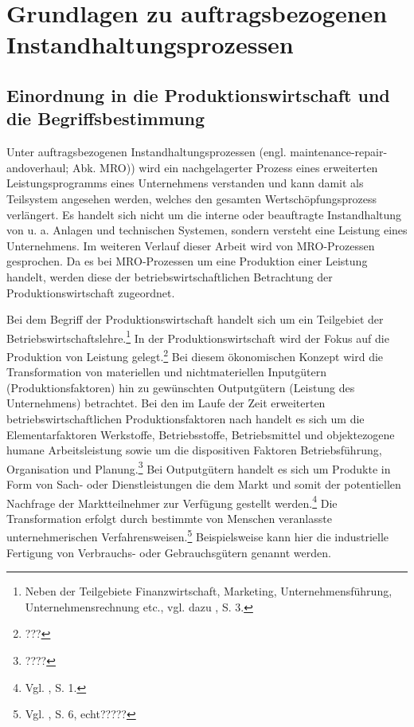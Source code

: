 \chapter{Grundlagen zu auftragsbezogenen Instandhaltungsprozessen}
\setcounter{footnote}{4}  %

\section{Einordnung in die Produktionswirtschaft und die Begriffsbestimmung}

Unter auftragsbezogenen Instandhaltungsprozessen (engl. maintenance-repair-and\-overhaul; Abk. MRO)) wird ein nachgelagerter Prozess eines erweiterten Leistungsprogramms eines Unternehmens verstanden und kann damit als Teilsystem angesehen werden, welches den gesamten Wertschöpfungsprozess verlängert. Es handelt sich nicht um die interne oder beauftragte Instandhaltung von u. a. Anlagen und technischen Systemen, sondern versteht eine Leistung eines Unternehmens. Im weiteren Verlauf dieser Arbeit wird von MRO-Prozessen gesprochen. Da es bei MRO-Prozessen um eine Produktion einer Leistung handelt, werden diese der betriebswirtschaftlichen Betrachtung der Produktionswirtschaft zugeordnet.

Bei dem Begriff der Produktionswirtschaft handelt sich um ein Teilgebiet der Betriebswirtschaftslehre.\footnote{Neben der Teilgebiete Finanzwirtschaft, Marketing, Unternehmensführung, Unternehmensrechnung etc., vgl. dazu \cite{Dyckhoff2010}, S. 3.} In der Produktionswirtschaft wird der Fokus auf die Produktion von Leistung gelegt.\footnote{???} Bei diesem ökonomischen Konzept wird die Transformation von materiellen und nichtmateriellen Inputgütern (Produktionsfaktoren) hin zu gewünschten Outputgütern (Leistung des Unternehmens) betrachtet. Bei den im Laufe der Zeit erweiterten betriebswirtschaftlichen Produktionsfaktoren nach \citet[S. 71]{Gutenberg:1959aa} handelt es sich um die Elementarfaktoren Werkstoffe, Betriebsstoffe, Betriebsmittel und objektezogene humane Arbeitsleistung sowie um die dispositiven Faktoren Betriebsführung, Organisation und Planung.\footnote{????} Bei Outputgütern handelt es sich um Produkte in Form von Sach- oder Dienstleistungen die dem Markt und somit der potentiellen Nachfrage der Marktteilnehmer zur Verfügung gestellt werden.\footnote{Vgl. \cite{Schmidt:2012aa}, S. 1.} Die Transformation erfolgt durch bestimmte von Menschen veranlasste unternehmerischen Verfahrensweisen.\footnote{Vgl. \cite{tempelmeier1994produktion}, S. 6, echt?????} Beispielsweise kann hier die industrielle Fertigung von Verbrauchs- oder Gebrauchsgütern genannt werden.

